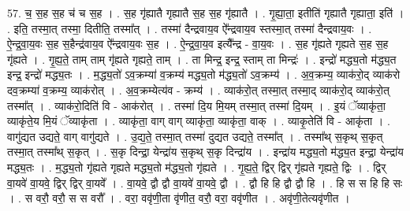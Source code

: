 \documentclass[17pt]{extarticle}
\begin{document}
57. च॒ स॒ह स॒ह च॑ च स॒ह । . स॒ह गृ॑ह्यातै गृह्यातै स॒ह स॒ह गृ॑ह्यातै । . गृ॒ह्या॒ता॒ इतीति॑ गृह्यातै गृह्याता॒ इति॑ । . इति॒ तस्मा॒त् तस्मा॒ दितीति॒ तस्मा᳚त् । . तस्मा॑ दैन्द्रवाय॒व ऐ᳚न्द्रवाय॒व स्तस्मा॒त् तस्मा॑ दैन्द्रवाय॒वः । . ऐ॒न्द्र॒वा॒य॒वः स॒ह स॒हैन्द्र॑वाय॒व ऐ᳚न्द्रवाय॒वः स॒ह । . ऐ॒न्द्र॒वा॒य॒व इत्यै᳚न्द्र - वा॒य॒वः । . स॒ह गृ॑ह्यते गृह्यते स॒ह स॒ह गृ॑ह्यते । . गृ॒ह्य॒ते॒ ताम् ताम् गृ॑ह्यते गृह्यते॒ ताम् । . ता मिन्द्र॒ इन्द्र॒ स्ताम् ता मिन्द्रः॑ । . इन्द्रो॑ मद्ध्य॒तो म॑द्ध्य॒त इन्द्र॒ इन्द्रो॑ मद्ध्य॒तः । . म॒द्ध्य॒तो॑ ऽव॒क्रम्या॑ व॒क्रम्य॑ मद्ध्य॒तो म॑द्ध्य॒तो॑ ऽव॒क्रम्य॑ । . अ॒व॒क्रम्य॒ व्याक॑रो॒द् व्याक॑रो दव॒क्रम्या॑ व॒क्रम्य॒ व्याक॑रोत् । . अ॒व॒क्रम्येत्य॑व - क्रम्य॑ । . व्याक॑रो॒त् तस्मा॒त् तस्मा॒द् व्याक॑रो॒द् व्याक॑रो॒त् तस्मा᳚त् । . व्याक॑रो॒दिति॑ वि - आक॑रोत् । . तस्मा॑ दि॒य मि॒यम् तस्मा॒त् तस्मा॑ दि॒यम् । . इ॒यं ॅव्याकृ॑ता॒ व्याकृ॑ते॒य मि॒यं ॅव्याकृ॑ता । . व्याकृ॑ता॒ वाग् वाग् व्याकृ॑ता॒ व्याकृ॑ता॒ वाक् । . व्याकृ॒तेति॑ वि - आकृ॑ता । . वागु॑द्यत उद्यते॒ वाग् वागु॑द्यते । . उ॒द्य॒ते॒ तस्मा॒त् तस्मा॑ दुद्यत उद्यते॒ तस्मा᳚त् । . तस्मा᳚थ् स॒कृथ् स॒कृत् तस्मा॒त् तस्मा᳚थ् स॒कृत् । . स॒कृ दिन्द्रा॒ येन्द्रा॑य स॒कृथ् स॒कृ दिन्द्रा॑य । . इन्द्रा॑य मद्ध्य॒तो म॑द्ध्य॒त इन्द्रा॒ येन्द्रा॑य मद्ध्य॒तः । . म॒द्ध्य॒तो गृ॑ह्यते गृह्यते मद्ध्य॒तो म॑द्ध्य॒तो गृ॑ह्यते । . गृ॒ह्य॒ते॒ द्विर् द्विर् गृ॑ह्यते गृह्यते॒ द्विः । . द्विर् वा॒यवे॑ वा॒यवे॒ द्विर् द्विर् वा॒यवे᳚ । . वा॒यवे॒ द्वौ द्वौ वा॒यवे॑ वा॒यवे॒ द्वौ । . द्वौ हि हि द्वौ द्वौ हि । . हि स स हि हि सः । . स वरौ॒ वरौ॒ स स वरौ᳚ । . वरा॒ ववृ॑णी॒ता वृ॑णीत॒ वरौ॒ वरा॒ ववृ॑णीत । . अवृ॑णी॒तेत्यवृ॑णीत । \newline
\end{document}
